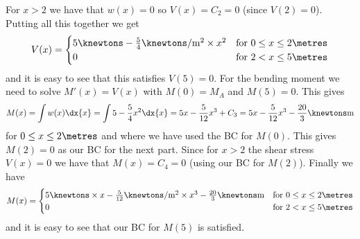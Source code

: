 {\begin{enumerate}
{        For $x > 2$ we have that $w(x)=0$ so $V(x) = C_2 = 0$ (since
        $V(2)=0$). Putting all this together we get
        \[
          V(x) =
          \begin{cases}
            5\knewtons - \frac{5}{4}\knewtons/\mathrm{m}^2 \times x^2
                & \text{for } 0 \leq x \leq 2\metres \\
            0   & \text{for } 2 < x \leq 5\metres
          \end{cases}
        \]
        and it is easy to see that this satisfies $V(5) = 0$.\newline
        For the bending moment we need to solve $M'(x) = V(x)$ with $M(0)=M_A$
        and $M(5) = 0$. This gives
        \[
          M(x) = \int w(x)\dx{x}
               = \int 5 - \frac{5}{4}x^2 \dx{x}
               = 5x - \frac{5}{12}x^3 + C_3
               = 5x - \frac{5}{12}x^3 - \frac{20}{3}\knewtons\mathrm{m}
        \]
        for $0 \leq x \leq 2\metres$ and where we have used the BC for $M(0)$.
        This gives $M(2) = 0$ as our BC for the next part. Since for $x > 2$
        the shear stress $V(x)=0$ we have that $M(x) = C_4 = 0$ (using our BC
        for $M(2)$). Finally we have
        \[
          M(x) =
          \begin{cases}
            5\knewtons \times x - \frac{5}{12}\knewtons/\mathrm{m}^2 \times x^3
                                - \frac{20}{3}\knewtons\mathrm{m}
                & \text{for } 0 \leq x \leq 2\metres \\
            0   & \text{for } 2 < x \leq 5\metres
          \end{cases}
        \]
        and it is easy to see that our BC for $M(5)$ is satisfied.
      }
  \end{enumerate}
}

